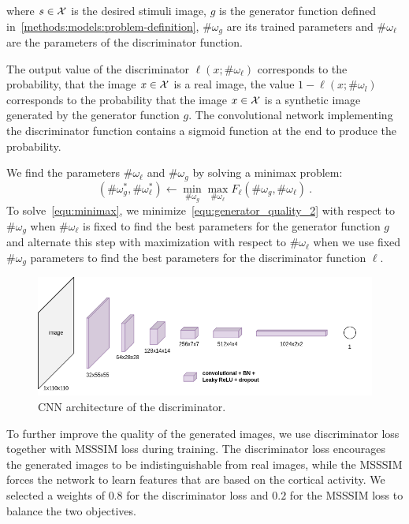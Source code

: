 where $s \in {\cal X}$ is the desired stimuli image, $g$ is the generator function defined in~\ref{methods:models:problem-definition}, $\#\omega_g$ are its trained parameters and $\#\omega_\ell$ are the parameters of the discriminator function.

The output value of the discriminator $\ell(x; \#\omega_\ell)$ corresponds to the probability, that the image $x \in {\cal X}$ is a real image, the value $1 - \ell(x; \#\omega_l)$ corresponds to the probability that the image $x \in {\cal X}$ is a synthetic image generated by the generator function $g$. The convolutional network implementing the discriminator function contains a sigmoid function at the end to produce the probability.

We find the parameters $\#\omega_\ell$ and $\#\omega_g$ by solving a minimax problem:
\begin{equation}
   \label{equ:minimax}
    (\#\omega^*_g, \#\omega_\ell^*) \leftarrow \min_{\#\omega_g}\max_{\#\omega_\ell} 
    F_\ell(\#\omega_g, \#\omega_\ell) \:.
\end{equation}
To solve~\ref{equ:minimax}, we minimize~\ref{equ:generator_quality_2} with respect to $\#\omega_g$ when $\#\omega_\ell$ is fixed to find the best parameters for the generator function $g$ and alternate this step with maximization with respect to $\#\omega_\ell$ when we use fixed $\#\omega_g$ parameters to find the best parameters for the discriminator function $\ell$.

\begin{figure}[H]\centering
\includegraphics[width=140mm]{img/discriminator.drawio.png}
\caption{CNN architecture of the discriminator.}
\label{img:methods:losses:adversarial}
\end{figure}

To further improve the quality of the generated images, we use discriminator loss together with MSSSIM loss during training. The discriminator loss encourages the generated images to be indistinguishable from real images, while the MSSSIM forces the network to learn features that are based on the cortical activity. We selected a weights of $0.8$ for the discriminator loss and $0.2$ for the MSSSIM loss to balance the two objectives.
